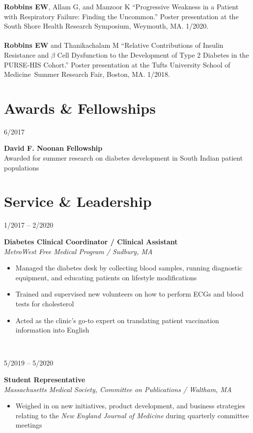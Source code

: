 \documentclass{book}
\newcommand\colleft{.20}
\newcommand\colright{.75}
\newcommand{\entryfour}[4]
	{
		\begin{minipage}[t]{\colleft\textwidth}
		\hfill \textsc{#1}
		\end{minipage}
		\hfill\vline\hfill
		\begin{minipage}[t]{\colright\textwidth}
		{\bf#2}\\
		\textit{#3}
		\footnotesize{#4}
		\end{minipage}\\
		\entryvspace
	}%
\newcommand{\entrythree}[3]
{
	\begin{minipage}[t]{\colleft\textwidth}
		\hfill \textsc{#1}
	\end{minipage}
	\hfill\vline\hfill
	\begin{minipage}[t]{\colright\textwidth}
		{\bf#2}\\
		\footnotesize{#3}
	\end{minipage}
	\entryvspace
}%
\newcommand{\entryvspace}{\vspace{0.5em}}
\newcommand{\medschool}{Tufts University School of Medicine}
\begin{document}
	\textbf{Robbins EW}, Allam G, and Manzoor K ``Progressive Weakness in a Patient with Respiratory Failure: Finding the Uncommon.'' Poster presentation at the South Shore Health Research Symposium, Weymouth, MA. 1/2020.
	\\ \\
	\textbf{Robbins EW} and Thanikachalam M ``Relative Contributions of Insulin Resistance and $\beta$ Cell Dysfunction to the Development of Type 2 Diabetes in the PURSE-HIS Cohort.'' Poster presentation at the \medschool \ Summer Research Fair, Boston, MA. 1/2018.
	
	\section*{Awards \& Fellowships}
		
		\entrythree{6/2017}{David F. Noonan Fellowship}{Awarded for summer research on diabetes development in South Indian patient populations}
	\section*{Service \& Leadership}
	\entryfour{1/2017 -- 2/2020}{Diabetes Clinical Coordinator / Clinical Assistant}{MetroWest Free Medical Program / Sudbury, MA}{%
	\begin{itemize}
		\item Managed the diabetes desk by collecting blood samples, running diagnostic equipment, and educating patients on lifestyle modifications
		\item Trained and supervised new volunteers on how to perform ECGs and blood tests for cholesterol 
		\item Acted as the clinic's go-to expert on translating patient vaccination information into English
	\end{itemize}
	}

	\entryfour{5/2019 -- 5/2020}{Student Representative}{Massachusetts Medical Society, Committee on Publications / Waltham, MA}{%
		\begin{itemize}
			\item Weighed in on new initiatives, product development, and business strategies relating to the \emph{New England Journal of Medicine} during quarterly committee meetings
		\end{itemize}
	}
\end{document}
